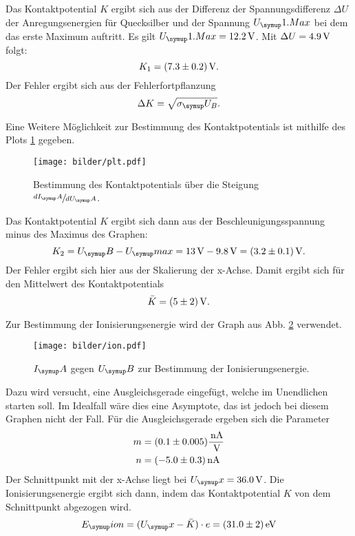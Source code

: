 Das Kontaktpotential $K$ ergibt sich aus der Differenz der Spannungsdifferenz $\Delta U$
der Anregungsenergien für Quecksilber und der Spannung $U_\su{1.Max}$ bei dem das
erste Maximum auftritt. Es gilt $U_\su{1.Max} = 12.2\Volt$. Mit $\Delta U = 4.9\,\si{\volt}$
folgt:
\begin{equation}
  K_1 = (7.3\pm0.2)\,\si{\volt}.
\end{equation}
Der Fehler ergibt sich aus der Fehlerfortpflanzung
\begin{equation}
  \Delta K = \sqrt{\sigma_\su{U_B}}.
\end{equation}

Eine Weitere Möglichkeit zur Bestimmung des Kontaktpotentials ist mithilfe
des Plots \ref{fig:plot} gegeben.
\begin{figure}
  \centering
  \texttt{[image: bilder/plt.pdf]}
  \caption{Bestimmung des Kontaktpotentials über die Steigung $\sfrac{dI_\su{A}}{dU_\su{A}}$.}
  \label{fig:plot}
\end{figure}
Das Kontaktpotential $K$ ergibt sich dann aus der Beschleunigungsspannung minus
des Maximus des Graphen:
\begin{equation}
  K_2 = U_\su{B} - U_\su{max} = 13\Volt - 9.8\Volt = (3.2\pm0.1)\Volt.
\end{equation}
Der Fehler ergibt sich hier aus der Skalierung der x-Achse.
Damit ergibt sich für den Mittelwert des Kontaktpotentials
\begin{equation}
  \bar{K} = (5 \pm 2) \,\si{\volt}.
\end{equation}

Zur Bestimmung der Ionisierungsenergie wird der Graph aus Abb. \ref{fig:ion}
verwendet.
\begin{figure}
  \centering
  \texttt{[image: bilder/ion.pdf]}
  \caption{$I_\su{A}$ gegen $U_\su{B}$ zur Bestimmung der Ionisierungsenergie.}
  \label{fig:ion}
\end{figure}
Dazu wird versucht, eine Ausgleichsgerade eingefügt, welche im Unendlichen starten
soll. Im Idealfall wäre dies eine Asymptote, das ist jedoch bei diesem Graphen nicht
der Fall.
Für die Ausgleichsgerade ergeben sich die Parameter
\begin{align*}
  m&= (0.1\pm 0.005)\frac{\,\si{\nano\ampere}}{\,\si{\volt}} \\
  n&= (-5.0\pm 0.3)\,\si{\nano\ampere}
\end{align*}
Der Schnittpunkt mit der x-Achse liegt bei $U_\su{x} = 36.0 \Volt$.
Die Ionisierungsenergie ergibt sich dann, indem das Kontaktpotential $K$ von
dem Schnittpunkt abgezogen wird.
\begin{equation}
  E_\su{ion} = (U_\su{x}-\bar{K}) \cdot e = (31.0\pm2)\eV
\end{equation}
